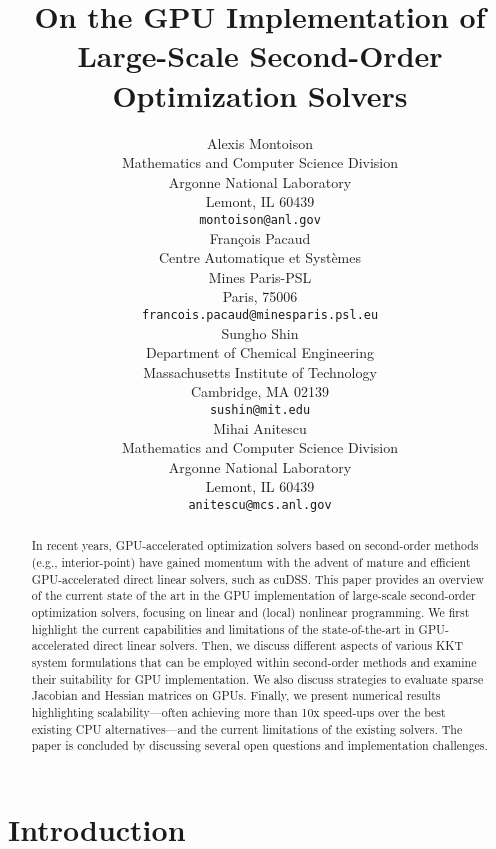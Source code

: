 \documentclass{article}
\title{On the GPU Implementation of Large-Scale Second-Order Optimization Solvers}
\author{%
  Alexis Montoison\\
  Mathematics and Computer Science Division\\
  Argonne National Laboratory\\
  Lemont, IL 60439\\
  \texttt{montoison@anl.gov}\\
  \And
  Fran\c{c}ois Pacaud\\
  Centre Automatique et Systèmes\\
  Mines Paris-PSL\\
  Paris, 75006 \\
  \texttt{francois.pacaud@minesparis.psl.eu}\\
  \And
  Sungho Shin\\
  Department of Chemical Engineering\\
  Massachusetts Institute of Technology\\
  Cambridge, MA 02139\\
  \texttt{sushin@mit.edu}\\
  \And
  Mihai Anitescu\\
  Mathematics and Computer Science Division\\
  Argonne National Laboratory\\
  Lemont, IL 60439\\
  \texttt{anitescu@mcs.anl.gov}\\
}
\begin{document}
\maketitle


\begin{abstract}
In recent years, GPU-accelerated optimization solvers based on second-order methods (e.g., interior-point) have gained momentum with the advent of mature and efficient GPU-accelerated direct linear solvers, such as cuDSS. This paper provides an overview of the current state of the art in the GPU implementation of large-scale second-order optimization solvers, focusing on linear and (local) nonlinear programming. We first highlight the current capabilities and limitations of the state-of-the-art in GPU-accelerated direct linear solvers. Then, we discuss different aspects of various KKT system formulations that can be employed within second-order methods and examine their suitability for GPU implementation. We also discuss strategies to evaluate sparse Jacobian and Hessian matrices on GPUs. Finally, we present numerical results highlighting scalability---often achieving more than 10x speed-ups over the best existing CPU alternatives---and the current limitations of the existing solvers. The paper is concluded by discussing several open questions and implementation challenges.
\end{abstract}


\section{Introduction}\label{eqn:intro}

\end{document}
